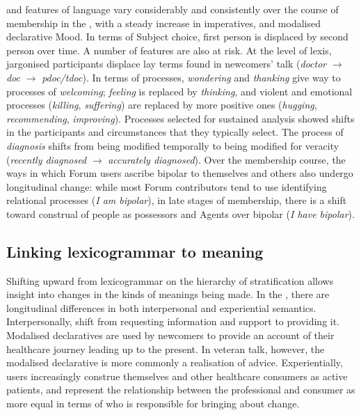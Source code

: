  and  features of language vary considerably and consistently over the course of membership in the , with a steady increase in imperatives, and modalised declarative Mood. In terms of Subject choice, first person is displaced by second person over time. A number of  features are also at risk. At the level of lexis, jargonised participants displace lay terms found in newcomers' talk (\emph{doctor} $\rightarrow$ \emph{doc} $\rightarrow$ \emph{pdoc\slash tdoc}). In terms of processes, \emph{wondering} and \emph{thanking} give way to processes of \emph{welcoming}; \emph{feeling} is replaced by \emph{thinking}, and violent and emotional processes (\emph{killing}, \emph{suffering}) are replaced by more positive ones (\emph{hugging}, \emph{recommending}, \emph{improving}). Processes selected for sustained analysis showed shifts in the participants and circumstances that they typically select. The process of \emph{diagnosis} shifts from being modified temporally to being modified for veracity (\emph{recently diagnosed} $\rightarrow$ \emph{accurately diagnosed}). Over the membership course, the ways in which \gls{Forum} users ascribe \gls{bipolar} to themselves and others also undergo longitudinal change: while most \gls{Forum} contributors tend to use identifying relational processes (\emph{I am bipolar}), in late stages of membership, there is a shift toward construal of people as possessors and Agents over \gls{bipolar} (\emph{I have bipolar}). %

\subsection{Linking lexicogrammar to meaning}

Shifting upward from lexicogrammar on the hierarchy of stratification allows insight into changes in the kinds of meanings being made. In the , there are longitudinal differences in both interpersonal and experiential semantics. Interpersonally,  shift from requesting information and support to providing it. Modalised declaratives are used by newcomers to provide an account of their healthcare journey leading up to the present. In veteran talk, however, the modalised declarative is more commonly a realisation of advice. Experientially, users increasingly construe themselves and other healthcare consumers as active patients, and represent the relationship between the professional and consumer as more equal in terms of who is responsible for bringing about change.

